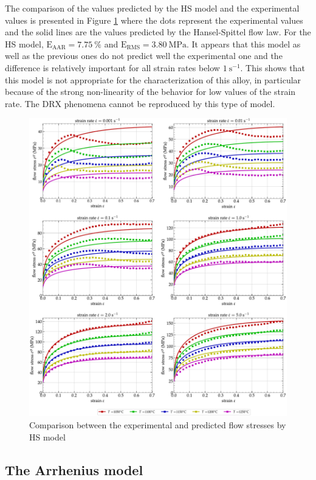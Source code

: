 \documentclass[twoside,english,1p,final,sort&compress]{elsarticle}
\theoremstyle{plain}
\DeclareRobustCommand{\RMSE}{\text{E}_\text{RMS}}
\DeclareRobustCommand{\AARE}{\text{E}_\text{AAR}}
\DeclareRobustCommand{\ps}{\text{s}^{-1}}
\DeclareRobustCommand{\MPa}{\text{MPa}}
\begin{document}
The comparison of the values predicted by the HS model and the experimental values is presented in Figure \ref{fig:CompExp-HS-6} where the dots represent the experimental values and the solid lines are the values predicted by the Hansel-Spittel flow law.
For the HS model, $\AARE=7.75~\%$ and $\RMSE=3.80~\MPa$.
It appears that this model as well as the previous ones do not predict well the experimental one and the difference is relatively important for all strain rates below $1~\ps$.
This shows that this model is not appropriate for the characterization of this alloy, in particular because of the strong non-linearity of the behavior for low values of the strain rate.
The DRX phenomena cannot be reproduced by this type of model.

\begin{figure}[!ht]
\centering
\includegraphics[width=\columnwidth]
{Figures/CompExp-HS-6}
\caption{Comparison between the experimental and predicted flow stresses by HS model}
\label{fig:CompExp-HS-6}
\end{figure}

\subsection{The Arrhenius model\label{sec:ARmodel}}
\end{document}
